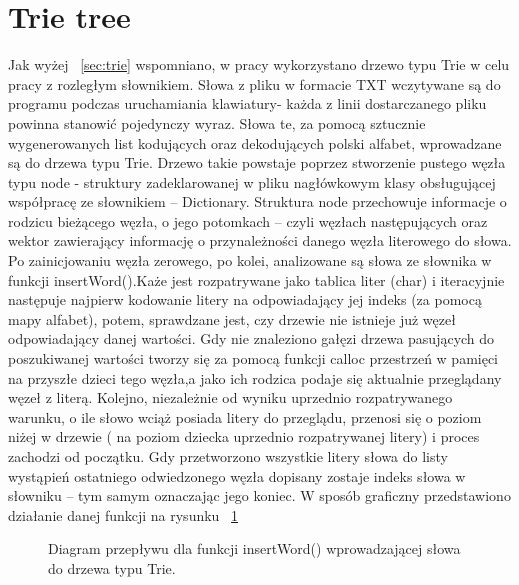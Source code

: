 \documentclass[twoside,a4paper]{book}
\begin{document}
\section{Trie tree}\label{sec:trietree}
Jak wyżej ~\ref{sec:trie}  wspomniano, w pracy wykorzystano drzewo typu Trie w celu pracy z rozległym słownikiem. Słowa z pliku w formacie TXT wczytywane są do programu podczas uruchamiania klawiatury- każda z linii dostarczanego pliku powinna stanowić pojedynczy wyraz. Słowa te, za pomocą sztucznie wy\-ge\-ne\-ro\-wa\-nych list kodujących oraz dekodujących polski alfabet, wprowadzane są do drzewa typu Trie. Drzewo takie powstaje poprzez stworzenie pustego węzła typu node - struktury zadeklarowanej w pliku nagłówkowym klasy obsługującej współpracę ze słownikiem – Dictionary. Struktura node przechowuje informacje o rodzicu bieżącego węzła, o jego potomkach – czyli węzłach następujących oraz wektor zawierający informację o przynależności danego węzła literowego do słowa. 
Po zainicjowaniu węzła zerowego, po kolei, analizowane są słowa ze słownika w funkcji insertWord().Każe jest rozpatrywane jako tablica liter (char) i iteracyjnie następuje najpierw kodowanie litery na odpowiadający jej indeks (za pomocą  mapy alfabet), potem, sprawdzane jest, czy drzewie nie istnieje już węzeł odpowiadający danej wartości. Gdy nie znaleziono gałęzi drzewa pasujących do poszukiwanej wartości tworzy się za pomocą funkcji calloc przestrzeń w pamięci na przyszłe dzieci tego węzła,a jako ich rodzica podaje się aktualnie przeglądany węzeł z literą. Kolejno, niezależnie od wyniku uprzednio rozpatrywanego warunku, o ile słowo wciąż posiada litery do przeglądu, przenosi się o poziom niżej w drzewie ( na poziom dziecka  uprzednio rozpatrywanej litery) i proces zachodzi od początku.  Gdy przetworzono wszystkie litery słowa do listy wystąpień ostatniego odwiedzonego węzła dopisany zostaje indeks słowa w słowniku – tym samym oznaczając jego koniec. W sposób graficzny przed\-sta\-wio\-no działanie danej funkcji na rysunku ~\ref{fig:insertWord}
\begin{figure}[!h]
		\centering
		\caption{Diagram przepływu dla funkcji insertWord() wprowadzającej słowa do drzewa typu Trie. }
		\label{fig:insertWord}
\end{figure}
\end{document}
